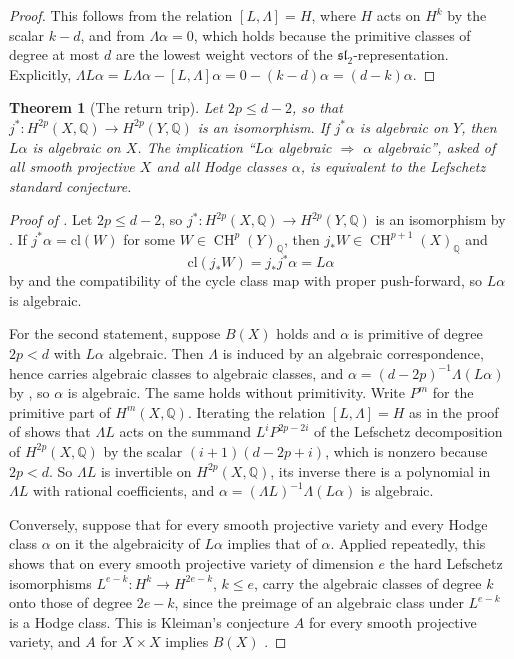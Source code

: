 \documentclass[11pt,reqno]{amsart}
\theoremstyle{plain}
\newtheorem{theorem}{Theorem}[section]
\theoremstyle{definition}
\theoremstyle{remark}
\newcommand{\QQ}{\mathbb{Q}}
\newcommand{\cl}{\mathrm{cl}}
\DeclareMathOperator{\CH}{CH}
\begin{document}
\begin{proof}
This follows from the relation $[L,\Lambda]=H$, where $H$ acts on $H^{k}$ by
the scalar $k-d$, and from $\Lambda\alpha=0$, which holds because the
primitive classes of degree at most $d$ are the lowest weight vectors of the
$\mathfrak{sl}_{2}$-representation. Explicitly,
$\Lambda L\alpha=L\Lambda\alpha-[L,\Lambda]\alpha=0-(k-d)\alpha
=(d-k)\alpha$.
\end{proof}

\begin{theorem}[The return trip]\label{thm:returntrip}
Let $2p\le d-2$, so that $j^{*}\colon H^{2p}(X,\QQ)\to H^{2p}(Y,\QQ)$ is an
isomorphism. If $j^{*}\alpha$ is algebraic on $Y$, then $L\alpha$ is algebraic
on $X$. The implication ``$L\alpha$ algebraic $\Rightarrow$ $\alpha$
algebraic'', asked of all smooth projective $X$ and all Hodge classes
$\alpha$, is
equivalent to the Lefschetz standard conjecture.
\end{theorem}

\begin{proof}[Proof of ]
Let $2p\le d-2$, so $j^{*}\colon H^{2p}(X,\QQ)\to H^{2p}(Y,\QQ)$ is an
isomorphism by . If $j^{*}\alpha=\cl(W)$ for some
$W\in\CH^{p}(Y)_{\QQ}$, then $j_{*}W\in\CH^{p+1}(X)_{\QQ}$ and
\[
  \cl(j_{*}W)=j_{*}j^{*}\alpha=L\alpha
\]
by  and the compatibility of the cycle class map with
proper push-forward, so $L\alpha$ is algebraic.

For the second statement, suppose $B(X)$ holds and $\alpha$ is primitive of
degree $2p<d$ with $L\alpha$ algebraic. Then $\Lambda$ is induced by an algebraic correspondence, hence
carries algebraic classes to algebraic classes, and
$\alpha=(d-2p)^{-1}\Lambda(L\alpha)$ by , so $\alpha$ is
algebraic. The same holds without primitivity. Write $P^{m}$ for the
primitive part of $H^{m}(X,\QQ)$. Iterating the relation $[L,\Lambda]=H$ as in
the proof of  shows that $\Lambda L$ acts on the summand
$L^{i}P^{2p-2i}$ of the Lefschetz decomposition of $H^{2p}(X,\QQ)$ by the
scalar $(i+1)(d-2p+i)$, which is nonzero because $2p<d$. So $\Lambda L$ is
invertible on $H^{2p}(X,\QQ)$, its inverse there is a polynomial in
$\Lambda L$ with rational coefficients, and
$\alpha=(\Lambda L)^{-1}\Lambda(L\alpha)$ is algebraic.

Conversely, suppose that for every smooth projective variety and every Hodge
class $\alpha$ on it the algebraicity of $L\alpha$ implies that of $\alpha$.
Applied repeatedly, this shows that on every smooth projective variety of
dimension $e$ the hard Lefschetz isomorphisms
$L^{e-k}\colon H^{k}\to H^{2e-k}$, $k\le e$, carry the algebraic classes of
degree $k$ onto those of degree $2e-k$, since the preimage of an algebraic
class under $L^{e-k}$ is a Hodge class. This is Kleiman's conjecture $A$ for
every smooth projective variety, and $A$ for $X\times X$ implies $B(X)$
\cite{Kle68,Kle94}.
\end{proof}
\end{document}
